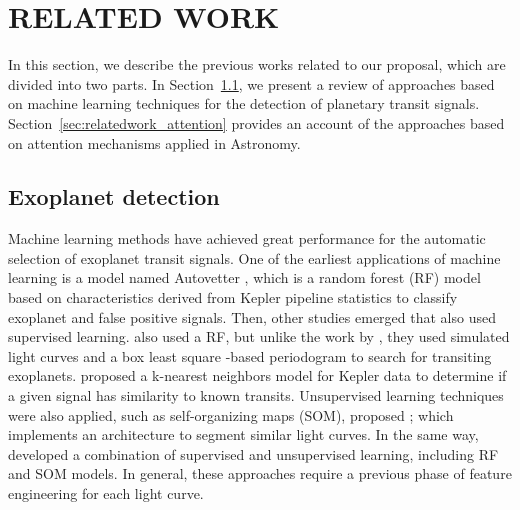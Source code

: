 \section{RELATED WORK}
\label{sec:relatedwork}
In this section, we describe the previous works related to our proposal, which are divided into two parts. In Section~\ref{sec:relatedwork_exoplanet}, we present a review of approaches based on machine learning techniques for the detection of planetary transit signals. Section~\ref{sec:relatedwork_attention} provides an account of the approaches based on attention mechanisms applied in Astronomy.\par

\subsection{Exoplanet detection}
\label{sec:relatedwork_exoplanet}
Machine learning methods have achieved great performance for the automatic selection of exoplanet transit signals. One of the earliest applications of machine learning is a model named Autovetter \citep{MCcauliff}, which is a random forest (RF) model based on characteristics derived from Kepler pipeline statistics to classify exoplanet and false positive signals. Then, other studies emerged that also used supervised learning. \cite{mislis2016sidra} also used a RF, but unlike the work by \citet{MCcauliff}, they used simulated light curves and a box least square \citep[BLS;][]{kovacs2002box}-based periodogram to search for transiting exoplanets. \citet{thompson2015machine} proposed a k-nearest neighbors model for Kepler data to determine if a given signal has similarity to known transits. Unsupervised learning techniques were also applied, such as self-organizing maps (SOM), proposed \citet{armstrong2016transit}; which implements an architecture to segment similar light curves. In the same way, \citet{armstrong2018automatic} developed a combination of supervised and unsupervised learning, including RF and SOM models. In general, these approaches require a previous phase of feature engineering for each light curve. \par


